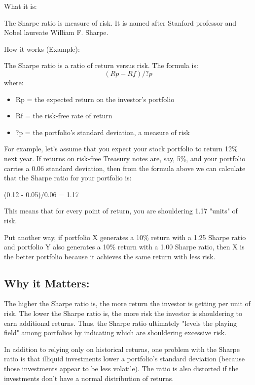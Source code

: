 
What it is: 


The Sharpe ratio is measure of risk. It is named after Stanford professor and Nobel laureate William F. Sharpe.


How it works (Example): 

The Sharpe ratio is a ratio of return versus risk. The formula is:
\[(Rp-Rf)/ ?p\]
 where:

\begin{itemize}
\item Rp = the expected return on the investor's portfolio
\item Rf = the risk-free rate of return
\item ?p = the portfolio's standard deviation, a measure of risk
\end{itemize}

For example, let's assume that you expect your stock portfolio to return 12\% next year. If returns on risk-free Treasury notes are, say, 5\%, and your portfolio carries a 0.06 standard deviation, then from the formula above we can calculate that the Sharpe ratio for your portfolio is:

(0.12 - 0.05)/0.06 = 1.17

This means that for every point of return, you are shouldering 1.17 "units" of risk.

Put another way, if portfolio X generates a 10\% return with a 1.25 Sharpe ratio and portfolio Y also generates a 10\% return with a 1.00 Sharpe ratio, then X is the better portfolio because it achieves the same return with less risk.


\subsection*{Why it Matters: }


The higher the Sharpe ratio is, the more return the investor is getting per unit of risk. The lower the Sharpe ratio is, the more risk the investor is shouldering to earn additional returns. Thus, the Sharpe ratio ultimately "levels the playing field" among portfolios by indicating which are shouldering excessive risk.

In addition to relying only on historical returns, one problem with the Sharpe ratio is that illiquid investments lower a portfolio's standard deviation (because those investments appear to be less volatile). The ratio is also distorted if the investments don't have a normal distribution of returns.
